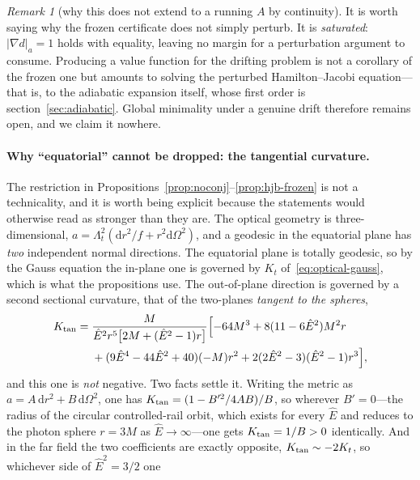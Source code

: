 \documentclass[12pt]{iopart}
\theoremstyle{plain}
\theoremstyle{definition}
\theoremstyle{remark}
\newtheorem{remark}[proposition]{Remark}
\newcommand{\Ehat}{\hat E}
\newcommand{\dd}{\mathrm{d}}
\begin{document}
\begin{remark}[why this does not extend to a running $A$ by continuity]
\label{rmk:nodrift}
It is worth saying why the frozen certificate does not simply perturb. It is
\emph{saturated}: $|\nabla d|_a=1$ holds with equality, leaving no margin for a
perturbation argument to consume. Producing a value function for the drifting
problem is not a corollary of the frozen one but amounts to solving the
perturbed Hamilton--Jacobi equation---that is, to the adiabatic expansion itself,
whose first order is section~\ref{sec:adiabatic}. Global minimality under a
genuine drift therefore remains open, and we claim it nowhere.
\end{remark}

\paragraph{Why ``equatorial'' cannot be dropped: the tangential curvature.}
The restriction in Propositions~\ref{prop:noconj}--\ref{prop:hjb-frozen} is not a
technicality, and it is worth being explicit because the statements would
otherwise read as stronger than they are. The optical geometry is
three-dimensional, $a=\Lambda_t^2(\dd r^2/f+r^2\dd\Omega^2)$, and a geodesic in
the equatorial plane has \emph{two} independent normal directions. The equatorial
plane is totally geodesic, so by the Gauss equation the in-plane one is governed
by $K_t$ of~\eqref{eq:optical-gauss}, which is what the propositions use. The
out-of-plane direction is governed by a second sectional curvature, that of the
two-planes \emph{tangent to the spheres},
\begin{equation}
    \begin{split}
    K_{\rm tan}={}&\frac{M}{\Ehat^2r^5\big[2M+(\Ehat^2-1)r\big]}
      \Big[{-}64M^3+8(11-6\Ehat^2)M^2r\\
      &+(9\Ehat^4-44\Ehat^2+40)(-M)r^2
      +2(2\Ehat^2-3)(\Ehat^2-1)r^3\Big] ,
    \end{split}
    \label{eq:ktan}
\end{equation}
and this one is \emph{not} negative. Two facts settle it. Writing the metric as
$a=A\,\dd r^2+B\,\dd\Omega^2$, one has $K_{\rm tan}=(1-B'^2/4AB)/B$, so wherever
$B'=0$---the radius of the circular controlled-rail orbit, which exists for every
$\Ehat$ and reduces to the photon sphere $r=3M$ as $\Ehat\to\infty$---one gets
$K_{\rm tan}=1/B>0$ identically. And in the far field the two coefficients are
exactly opposite, $K_{\rm tan}\sim-2K_t$, so whichever side of $\Ehat^2=3/2$ one
\end{document}

